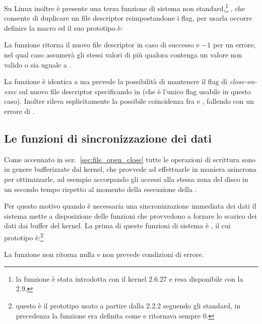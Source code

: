 Su Linux inoltre è presente una terza funzione di sistema non
standard,\footnote{la funzione è stata introdotta con il kernel 2.6.27 e resa
  disponibile con la  2.9.} , che consente di duplicare
un file descriptor reimpostandone i flag, per usarla occorre definire la macro
 ed il suo prototipo è:

\begin{funcproto}{
}

{La funzione ritorna il nuovo file descriptor in caso di successo e $-1$ per
  un errore, nel qual caso  assumerà gli stessi valori di
   più  qualora  contenga un valore
  non valido o  sia uguale a .
}  
\end{funcproto}

La funzione è identica a  ma prevede la possibilità di mantenere il
flag di \textit{close-on-exec} sul nuovo file descriptor specificando
 in  (che è l'unico flag usabile in questo
caso). Inoltre rileva esplicitamente la possibile coincidenza
fra  e , fallendo con un errore di .


\subsection{Le funzioni di sincronizzazione dei dati}
\label{sec:file_sync}

Come accennato in sez.~\ref{sec:file_open_close} tutte le operazioni di
scrittura sono in genere bufferizzate dal kernel, che provvede ad effettuarle
in maniera asincrona per ottimizzarle, ad esempio accorpando gli accessi alla
stessa zona del disco in un secondo tempo rispetto al momento della esecuzione
della .

Per questo motivo quando è necessaria una sincronizzazione immediata dei dati
il sistema mette a disposizione delle funzioni che provvedono a forzare lo
scarico dei dati dai buffer del kernel.  La prima di queste funzioni di
sistema è , il cui prototipo è:\footnote{questo è il prototipo
  usato a partire dalla  2.2.2 seguendo gli standard, in precedenza
  la funzione era definita come  e ritornava sempre $0$.}

\begin{funcproto}{
}

{La funzione non ritorna nulla e non prevede condizioni di errore.}  
\end{funcproto}

